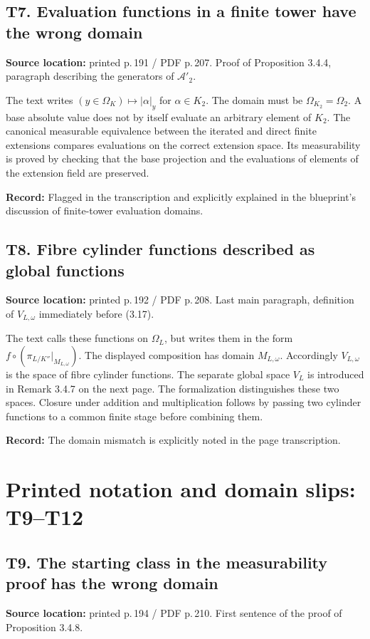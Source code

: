 \documentclass[10pt,a4paper]{article}
\newcommand{\loc}[2]{\textbf{Source location:} printed p.\,#1 / PDF p.\,#2.}
\newcommand{\hist}[1]{\par{\footnotesize\color{graytext}\textbf{Record:} #1}}
\newcommand{\A}{\mathcal A}
\begin{document}
\subsection{T7. Evaluation functions in a finite tower have the wrong domain}
\loc{191}{207} Proof of Proposition 3.4.4, paragraph describing the
generators of $\A'_2$.

The text writes $(y\in\Omega_K)\mapsto|\alpha|_y$ for $\alpha\in K_2$.
The domain must be \textbf{$\Omega_{K_2}=\Omega_2$}. A base absolute
value does not by itself evaluate an arbitrary element of $K_2$.
The canonical measurable equivalence between the iterated and direct
finite extensions compares evaluations on the correct extension space.
Its measurability is proved by checking that the base projection and
the evaluations of elements of the extension field are preserved.
\hist{Flagged in the transcription and explicitly explained in the
blueprint's discussion of finite-tower evaluation domains.}

\subsection{T8. Fibre cylinder functions described as global functions}
\loc{192}{208} Last main paragraph, definition of $V_{L,\omega}$
immediately before (3.17).

The text calls these functions on $\Omega_L$, but writes them in the
form $f\circ(\pi_{L/K''}|_{M_{L,\omega}})$. The displayed composition
has domain \textbf{$M_{L,\omega}$}. Accordingly $V_{L,\omega}$ is the
space of fibre cylinder functions. The separate global space $V_L$
is introduced in Remark 3.4.7 on the next page.
The formalization distinguishes these two spaces. Closure under addition
and multiplication follows by passing two cylinder functions to a common
finite stage before combining them.
\hist{The domain mismatch is explicitly noted in the page transcription.}

\newpage
\section{Printed notation and domain slips: T9--T12}\label{t9}

\subsection{T9. The starting class in the measurability proof has the wrong domain}
\loc{194}{210} First sentence of the proof of Proposition 3.4.8.
\end{document}
